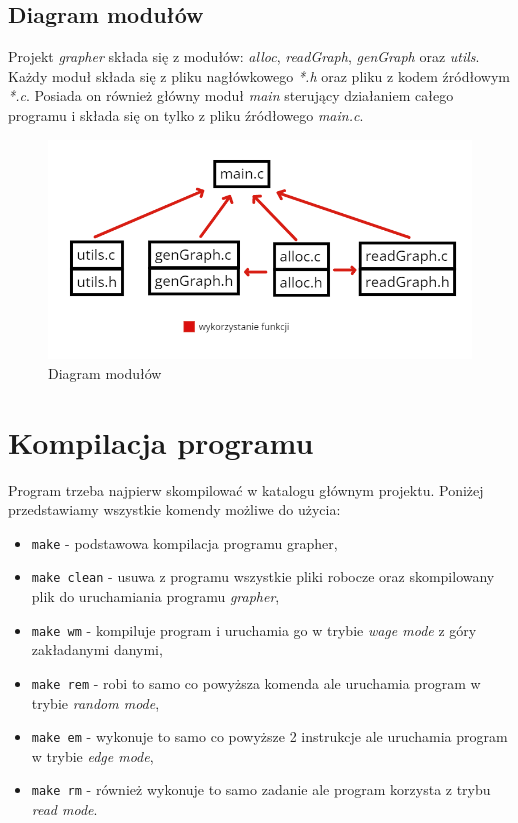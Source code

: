 \documentclass[10pt, a4paper]{report}
\begin{document}
    \subsection{Diagram modułów}
    Projekt \textit{grapher} składa się z modułów: \textit{alloc}, \textit{readGraph}, \textit{genGraph} oraz \textit{utils}. 
    Każdy moduł składa się z pliku nagłówkowego \textit{*.h} oraz pliku z kodem źródłowym \textit{*.c}.
    Posiada on również główny moduł \textit{main} sterujący działaniem całego programu i składa się on tylko z pliku źródłowego \textit{main.c}.
    \begin{figure}[h]
        \begin{center}
            \includegraphics[scale=0.6]{module_diagram_new.png}
            \caption {Diagram modułów}
        \end{center}
    \end{figure}

    \section{Kompilacja programu}
    Program trzeba najpierw skompilować w katalogu głównym projektu. Poniżej przedstawiamy wszystkie komendy możliwe do użycia:
    \begin{itemize}
        \item \texttt{make} - podstawowa kompilacja programu grapher,
        \item \texttt{make clean} - usuwa z programu wszystkie pliki robocze oraz skompilowany plik do uruchamiania programu \textit{grapher},
        \item \texttt{make wm} - kompiluje program i uruchamia go w trybie \textit{wage mode} z góry zakładanymi danymi,
        \item \texttt{make rem} - robi to samo co powyższa komenda ale uruchamia program w trybie \textit{random mode},
        \item \texttt{make em} - wykonuje to samo co powyższe 2 instrukcje ale uruchamia program w trybie \textit{edge mode},
        \item \texttt{make rm} - również wykonuje to samo zadanie ale program korzysta z trybu \textit{read mode}.
    \end{itemize}
\end{document}

